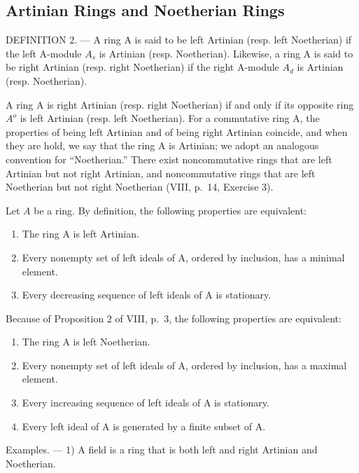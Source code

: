 \subsection{Artinian Rings and Noetherian Rings}

DEFINITION 2. --- A ring A is said to be left Artinian (resp. left Noetherian) if the left A-module \(A_{s}\) is Artinian (resp. Noetherian). Likewise, a ring A is said to be right Artinian (resp. right Noetherian) if the right A-module \(A_{d}\) is Artinian (resp. Noetherian).

A ring A is right Artinian (resp. right Noetherian) if and only if its opposite ring \(A^{o}\) is left Artinian (resp. left Noetherian). For a commutative ring A, the properties of being left Artinian and of being right Artinian coincide, and when they are hold, we say that the ring A is Artinian; we adopt an analogous convention for ``Noetherian.'' There exist noncommutative rings that are left Artinian but not right Artinian, and noncommutative rings that are left Noetherian but not right Noetherian (VIII, p.~14, Exercise 3).

Let \(A\) be a ring. By definition, the following properties are equivalent:

\begin{enumerate}
\def\labelenumi{(\roman{enumi})}
\item
  The ring A is left Artinian.
\item
  Every nonempty set of left ideals of A, ordered by inclusion, has a minimal element.
\item
  Every decreasing sequence of left ideals of A is stationary.
\end{enumerate}

Because of Proposition 2 of VIII, p.~3, the following properties are equivalent:

\begin{enumerate}
\def\labelenumi{(\roman{enumi})}
\item
  The ring A is left Noetherian.
\item
  Every nonempty set of left ideals of A, ordered by inclusion, has a maximal element.
\item
  Every increasing sequence of left ideals of A is stationary.
\item
  Every left ideal of A is generated by a finite subset of A.
\end{enumerate}

Examples. --- 1) A field is a ring that is both left and right Artinian and Noetherian.

